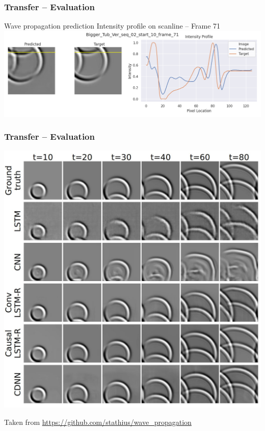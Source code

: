 \begin{frame}
    \frametitle{Transfer -- Evaluation}

Wave propagation prediction \newline
Intensity profile on scanline -- Frame 71\\[\baselineskip]

\includegraphics[width=\textwidth, height=.55\textheight]{./Ressourcen/Praesentation/Bilder/WaveTransfer/DFP/Bigger_Tub_Ver_seq_02_start_10_frame_71.png}%

\end{frame}
\clearpage

\begin{frame}
    \frametitle{Transfer -- Evaluation}
	\vspace*{6mm}
\includegraphics[width=.5\textwidth, height=.5\textheight]{./Ressourcen/Praesentation/Bilder/qualitative_test_set.jpg}

\vspace*{6mm}

Taken from \url{https://github.com/stathius/wave_propagation}

\end{frame}
\clearpage


